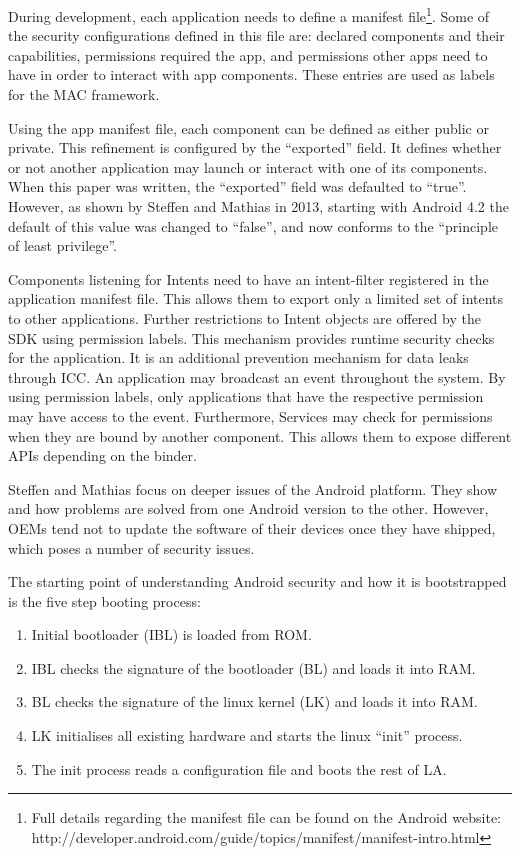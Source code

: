 During development, each application needs to define a manifest file\footnote{Full details regarding the manifest file can be found on the Android website: http://developer.android.com/guide/topics/manifest/manifest-intro.html}. Some of the security configurations defined in this file are: declared components and their capabilities, permissions required the app, and permissions other apps need to have in order to interact with app components. These entries are used as labels for the MAC framework. 

Using the app manifest file, each component can be defined as either public or private. This refinement is configured by the ``exported'' field. It defines whether or not another application may launch or interact with one of its components. When this paper was written, the ``exported'' field was defaulted to ``true''. However, as shown by Steffen and Mathias \cite{liebergeld2013android}  in 2013, starting with Android 4.2  the default of this value was changed to ``false'', and now conforms to the ``principle of least privilege''.

Components listening for Intents need to have an intent-filter registered in the application manifest file. This allows them to export only a limited set of intents to other applications. Further restrictions to Intent objects are offered by the SDK using permission labels. This mechanism provides runtime security checks for the application. It is an additional prevention mechanism for data leaks through ICC. An application may broadcast an event throughout the system. By using permission labels, only applications that have the respective permission may have access to the event. Furthermore, Services may check for permissions when they are bound by another component. This allows them to expose different APIs depending on the binder.

Steffen and Mathias \cite{liebergeld2013android} focus on deeper issues of the Android platform. They show and how problems are solved from one Android version to the other. However, OEMs tend not to update the software of their devices once they have shipped, which poses a number of security issues.

The starting point of understanding Android security and how it is bootstrapped is the five step booting process:
\begin{enumerate}
	\item Initial bootloader (IBL) is loaded from ROM.
	\item IBL checks the signature of the bootloader (BL) and loads it into RAM.
	\item BL checks the signature of the linux kernel (LK) and loads it into RAM.
	\item LK initialises all existing hardware and starts the linux ``init'' process.
	\item The init process reads a configuration file and boots the rest of LA.
\end{enumerate}

